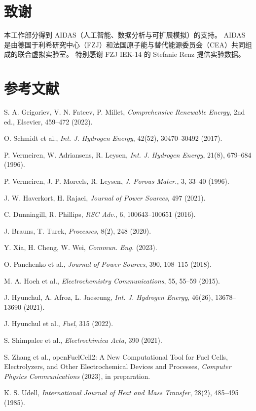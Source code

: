 \documentclass[UTF8,zihao=-4,fontset=fandol]{ctexart}
\begin{document}
\section*{致谢}
本工作部分得到 AIDAS（人工智能、数据分析与可扩展模拟）的支持。
AIDAS 是由德国于利希研究中心（FZJ）和法国原子能与替代能源委员会（CEA）共同组成的联合虚拟实验室。
特别感谢 FZJ IEK-14 的 Stefanie Renz 提供实验数据。

\section*{参考文献}
\begin{enumerate}[label={[\arabic*]},leftmargin=2.7em,itemsep=0.2em]\small
\item S. A. Grigoriev, V. N. Fateev, P. Millet, \emph{Comprehensive Renewable Energy}, 2nd ed., Elsevier, 459--472 (2022).
\item O. Schmidt et al., \emph{Int. J. Hydrogen Energy}, 42(52), 30470--30492 (2017).
\item P. Vermeiren, W. Adriansens, R. Leysen, \emph{Int. J. Hydrogen Energy}, 21(8), 679--684 (1996).
\item P. Vermeiren, J. P. Moreels, R. Leysen, \emph{J. Porous Mater.}, 3, 33--40 (1996).
\item J. W. Haverkort, H. Rajaei, \emph{Journal of Power Sources}, 497 (2021).
\item C. Dunningill, R. Phillips, \emph{RSC Adv.}, 6, 100643--100651 (2016).
\item J. Brauns, T. Turek, \emph{Processes}, 8(2), 248 (2020).
\item Y. Xia, H. Cheng, W. Wei, \emph{Commun. Eng.} (2023).
\item O. Panchenko et al., \emph{Journal of Power Sources}, 390, 108--115 (2018).
\item M. A. Hoeh et al., \emph{Electrochemistry Communications}, 55, 55--59 (2015).
\item J. Hyunchul, A. Afroz, L. Jaeseung, \emph{Int. J. Hydrogen Energy}, 46(26), 13678--13690 (2021).
\item J. Hyunchul et al., \emph{Fuel}, 315 (2022).
\item S. Shimpalee et al., \emph{Electrochimica Acta}, 390 (2021).
\item S. Zhang et al., openFuelCell2: A New Computational Tool for Fuel Cells, Electrolyzers, and Other Electrochemical Devices and Processes, \emph{Computer Physics Communications} (2023), in preparation.
\item K. S. Udell, \emph{International Journal of Heat and Mass Transfer}, 28(2), 485--495 (1985).

\end{enumerate}
\end{document}

